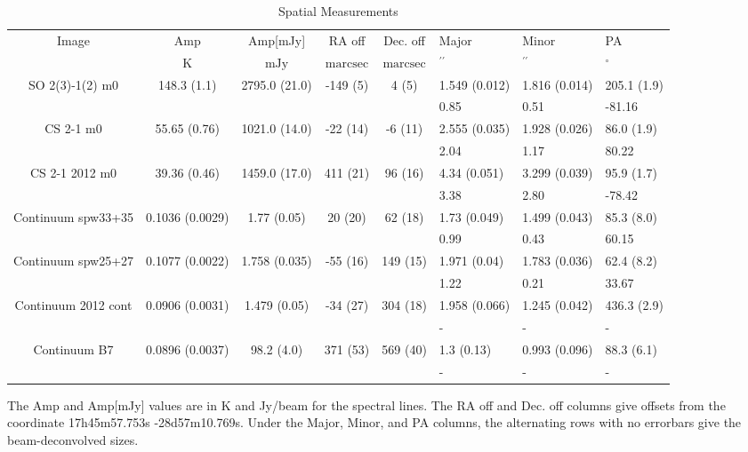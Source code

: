 \begin{table*}[htp]
\centering \small
\caption{Spatial Measurements}
\begin{tabular}{ccccclll}
\label{tab:spatial_measurements}
Image & Amp & Amp[mJy] & RA off & Dec. off & Major & Minor & PA \\
 & $\mathrm{K}$ & $\mathrm{mJy}$ & $\mathrm{marcsec}$ & $\mathrm{marcsec}$ & $\mathrm{{}^{\prime\prime}}$ & $\mathrm{{}^{\prime\prime}}$ & $\mathrm{{}^{\circ}}$ \\
\hline
SO 2(3)-1(2) m0 & 148.3 (1.1) & 2795.0 (21.0) & -149 (5) & 4 (5) & 1.549 (0.012) & 1.816 (0.014) & 205.1 (1.9) \\
 &  &  &  &  & 0.85 & 0.51 & -81.16 \\
CS 2-1 m0 & 55.65 (0.76) & 1021.0 (14.0) & -22 (14) & -6 (11) & 2.555 (0.035) & 1.928 (0.026) & 86.0 (1.9) \\
 &  &  &  &  & 2.04 & 1.17 & 80.22 \\
CS 2-1 2012 m0 & 39.36 (0.46) & 1459.0 (17.0) & 411 (21) & 96 (16) & 4.34 (0.051) & 3.299 (0.039) & 95.9 (1.7) \\
 &  &  &  &  & 3.38 & 2.80 & -78.42 \\
Continuum spw33+35 & 0.1036 (0.0029) & 1.77 (0.05) & 20 (20) & 62 (18) & 1.73 (0.049) & 1.499 (0.043) & 85.3 (8.0) \\
 &  &  &  &  & 0.99 & 0.43 & 60.15 \\
Continuum spw25+27 & 0.1077 (0.0022) & 1.758 (0.035) & -55 (16) & 149 (15) & 1.971 (0.04) & 1.783 (0.036) & 62.4 (8.2) \\
 &  &  &  &  & 1.22 & 0.21 & 33.67 \\
Continuum 2012 cont & 0.0906 (0.0031) & 1.479 (0.05) & -34 (27) & 304 (18) & 1.958 (0.066) & 1.245 (0.042) & 436.3 (2.9) \\
 &  &  &  &  & - & - & - \\
Continuum B7 & 0.0896 (0.0037) & 98.2 (4.0) & 371 (53) & 569 (40) & 1.3 (0.13) & 0.993 (0.096) & 88.3 (6.1) \\
 &  &  &  &  & - & - & - \\
\hline
\end{tabular}
\par
The Amp and Amp[mJy] values are in K \kms and Jy/beam \kms for the spectral lines.
The RA off and Dec. off columns give offsets from the coordinate 17h45m57.753s -28d57m10.769s.
Under the Major, Minor, and PA columns, the alternating rows with no errorbars give the beam-deconvolved sizes.

\end{table*}
